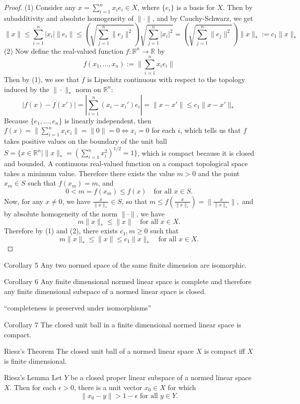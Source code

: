 \begin{proof}
    (1) Consider any $x=\sum_{i=1}^n x_ie_i\in X$, where $\{e_i\}$ is a basis for $X$.
    Then by subadditivity and absolute homogeneity of $\|\cdot\|$, and by Cauchy-Schwarz, we get
    \[
      \|x\|
      \le\sum_{i=1}^n|x_i|\|e_i\|
      \le\left(\sqrt{\sum_{j=1}^n\|e_j\|^2}\right)\sqrt{\sum_{j=1}^n|x_i|^2}
      =\left(\sqrt{\sum_{j=1}^n\|e_j\|^2}\right)\|x\|_*
      :=c_1\|x\|_*\tag{1}
    \]
    (2) Now define the real-valued function $f:\mathbb{R}^n\to\mathbb{R}$ by
    \[
        f(x_1,\dots,x_n):=\|\sum_{i=1}^n x_ie_i\|
    \]
    Then by (1), we see that $f$ is Lipschitz continuous with respect to the topology induced by the $\|\cdot\|_*$ norm on $\mathbb{R}^n$:
    \[
      |f(x)-f(x')|=|\sum_{i=1}^n (x_i-x_i')e_i|=\|x-x'\|\le c_1\|x-x'\|_*
    \]
    Because $\{e_1,\dots,e_n\}$ is linearly independent, then $f(x)=\|\sum_{i=1}^n x_ie_i\|=\|0\|=0\iff x_i=0$ for each $i$, which tells us that $f$ takes positive values on the boundary of the unit ball $S=\{x\in\mathbb{R}^n\mid \|x\|_*=(\sum_{i=1}^n x_i^2)^{1/2}=1\}$, which is compact because it is closed and bounded.
    A continuous real-valued function on a compact topological space takes a minimum value.
    Therefore there exists the value $m>0$ and the point $x_m\in S$ such that $f(x_m)=m$, and 
    \[
        0<m=f(x_m)\le f(x)\quad\text{for all }x\in S.
    \]
    Now, for any $x\neq0$, we have $\frac{x}{\|x\|_*}\in S$, so that 
    $
        m\le f(\frac{x}{\|x\|_*})=\|\frac{x}{\|x\|_*}\|,
    $
    and by absolute homogeneity of the norm $\|\cdot\|$, we have
    \[
        m\|x\|_*\le \|x\|\quad\text{for all }x\in X.\tag{2}
    \]  
    Therefore by (1) and (2), there exists $c_1,m\ge0$ such that 
    \[
        m\|x\|_*\le \|x\|\le c_1\|x\|_*\quad\text{for all }x\in X.
    \] 

\end{proof}
\begin{namedthm*}{Corollary 5}
    Any two normed space of the same finite dimension are isomorphic.
\end{namedthm*}
\begin{namedthm*}{Corollary 6}
    Any finite dimensional normed linear space is complete and therefore any finite dimensional subspace of a normed linear space is closed.
\end{namedthm*}
``completeness is preserved under isomorphisms''
\begin{namedthm*}{Corollary 7}
    The closed unit ball in a finite dimensional normed linear space is compact.
\end{namedthm*}
\begin{namedthm*}{Riesz's Theorem}
    The closed unit ball of a normed linear space $X$ is compact iff $X$ is finite dimensional.
\end{namedthm*}
\begin{namedthm*}{Riesz's Lemma}
    Let $Y$ be a closed proper linear subspace of a normed linear space $X$.
    Then for each $\epsilon>0$, there is a unit vector $x_0\in X$ for which 
    \[
        \|x_0-y\|>1-\epsilon\text{ for all }y\in Y.
    \]
\end{namedthm*}

